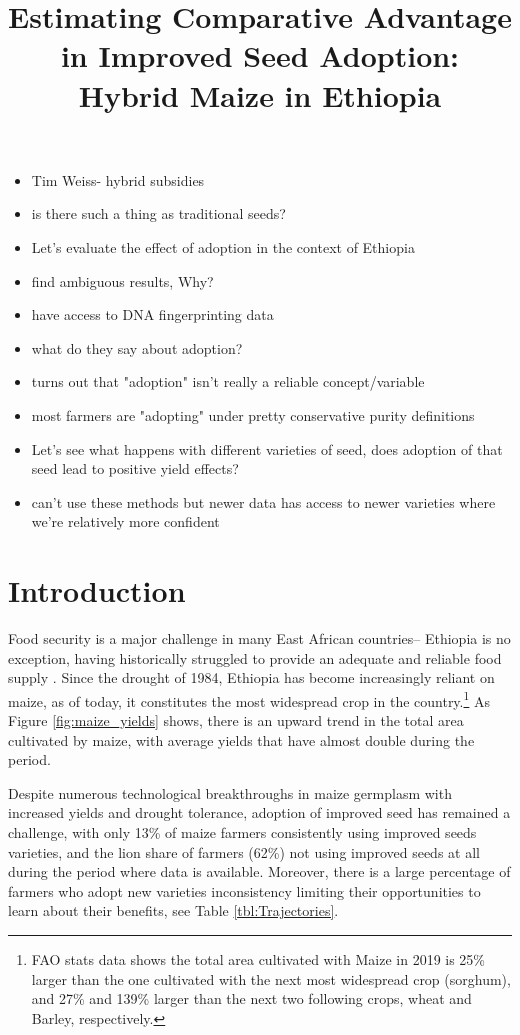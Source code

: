 \documentclass{article}
\title{Estimating Comparative Advantage in Improved Seed Adoption: Hybrid Maize in Ethiopia}
\begin{document}
\maketitle

\begin{itemize}
    \item Tim Weiss- hybrid subsidies
    \item is there such a thing as traditional seeds?
    \item Let's evaluate the effect of adoption in the context of Ethiopia
    \item find ambiguous results, Why?
    \item have access to DNA fingerprinting data
    \item what do they say about adoption?
    \item turns out that "adoption" isn't really a reliable concept/variable
    \item most farmers are "adopting" under pretty conservative purity definitions
    \item Let's see what happens with different varieties of seed, does adoption of that seed lead to positive yield effects?
    \item can't use these methods but newer data has access to newer varieties where we're relatively more confident
\end{itemize}

\section{Introduction}

Food security is a major challenge in many East African countries-- Ethiopia is no exception, having historically struggled to provide an adequate and reliable food supply \citep{Ramakrishna2002-hv, Jaleta2018-oj}. Since the drought of 1984, Ethiopia has become increasingly reliant on maize, as of today, it constitutes the most widespread crop in the country.\footnote{FAO stats data shows the total area cultivated with Maize in 2019 is 25\% larger than the one cultivated with the next most widespread crop (sorghum), and 27\% and 139\% larger than the next two following crops, wheat and Barley, respectively.} As Figure \ref{fig:maize_yields} shows, there is an upward trend in the total area cultivated by maize, with average yields that have almost double during the period.

Despite numerous technological breakthroughs in maize germplasm with increased yields and drought tolerance, adoption of improved seed has remained a challenge, with only 13\% of maize farmers consistently using improved seeds varieties, and the lion share of farmers (62\%) not using improved seeds at all during the period where data is available. Moreover, there is a large percentage of farmers who adopt new varieties inconsistency limiting their opportunities to learn about their benefits, see Table \ref{tbl:Trajectories}. 
\end{document}
